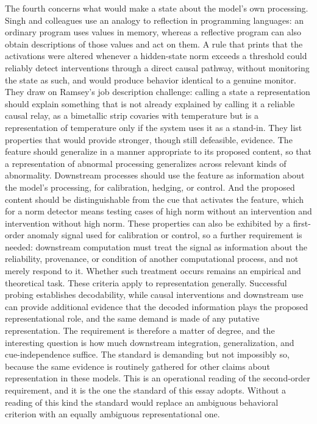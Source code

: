 \documentclass[11pt]{article}
\theoremstyle{definition}
\theoremstyle{remark}
\begin{document}
The fourth concerns what would make a state about the model's own processing. Singh and colleagues use an analogy to reflection in programming languages: an ordinary program uses values in memory, whereas a reflective program can also obtain descriptions of those values and act on them. A rule that prints that the activations were altered whenever a hidden-state norm exceeds a threshold could reliably detect interventions through a direct causal pathway, without monitoring the state as such, and would produce behavior identical to a genuine monitor. They draw on Ramsey's \citeyearpar{ramsey2007} job description challenge: calling a state a representation should explain something that is not already explained by calling it a reliable causal relay, as a bimetallic strip covaries with temperature but is a representation of temperature only if the system uses it as a stand-in. They list properties that would provide stronger, though still defeasible, evidence. The feature should generalize in a manner appropriate to its proposed content, so that a representation of abnormal processing generalizes across relevant kinds of abnormality. Downstream processes should use the feature as information about the model's processing, for calibration, hedging, or control. And the proposed content should be distinguishable from the cue that activates the feature, which for a norm detector means testing cases of high norm without an intervention and intervention without high norm. These properties can also be exhibited by a first-order anomaly signal used for calibration or control, so a further requirement is needed: downstream computation must treat the signal as information about the reliability, provenance, or condition of another computational process, and not merely respond to it. Whether such treatment occurs remains an empirical and theoretical task. These criteria apply to representation generally. Successful probing establishes decodability, while causal interventions and downstream use can provide additional evidence that the decoded information plays the proposed representational role, and the same demand is made of any putative representation. The requirement is therefore a matter of degree, and the interesting question is how much downstream integration, generalization, and cue-independence suffice. The standard is demanding but not impossibly so, because the same evidence is routinely gathered for other claims about representation in these models. This is an operational reading of the second-order requirement, and it is the one the standard of this essay adopts. Without a reading of this kind the standard would replace an ambiguous behavioral criterion with an equally ambiguous representational one.
\end{document}
